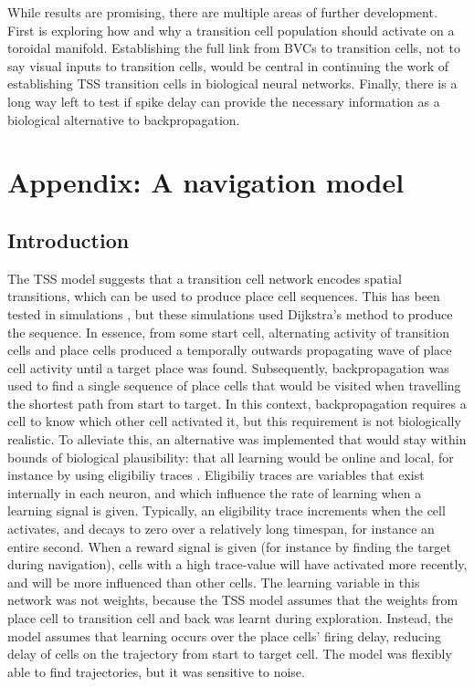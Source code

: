 \documentclass{article}
\begin{document}
    While results are promising, there are multiple areas of further development. First is exploring how and why a transition cell population should activate on a toroidal manifold. Establishing the full link from BVCs to transition cells, not to say visual inputs to transition cells, would be central in continuing the work of establishing TSS transition cells in biological neural networks. Finally, there is a long way left to test if spike delay can provide the necessary information as a biological alternative to backpropagation.

    \newpage
    \printbibliography{}

    \newpage
    \appendix
    \section{Appendix: A navigation model} \label{Appendix}
    \subsection{Introduction}
    The TSS model suggests that a transition cell network encodes spatial transitions, which can be used to produce place cell sequences. This has been tested in simulations \parencite{Waniek2020}, but these simulations used Dijkstra's method to produce the sequence. In essence, from some start cell, alternating activity of transition cells and place cells produced a temporally outwards propagating wave of place cell activity until a target place was found. Subsequently, backpropagation was used to find a single sequence of place cells that would be visited when travelling the shortest path from start to target. In this context, backpropagation requires a cell to know which other cell activated it, but this requirement is not biologically realistic.
    To alleviate this, an alternative was implemented that would stay within bounds of biological plausibility: that all learning would be online and local, for instance by using eligibiliy traces \parencite{VanDerVeen2022}. Eligibiliy traces are variables that exist internally in each neuron, and which influence the rate of learning when a learning signal is given. Typically, an eligibility trace increments when the cell activates, and decays to zero over a relatively long timespan, for instance an entire second. When a reward signal is given (for instance by finding the target during navigation), cells with a high trace-value will have activated more recently, and will be more influenced than other cells.
    The learning variable in this network was not weights, because the TSS model assumes that the weights from place cell to transition cell and back was learnt during exploration. Instead, the model assumes that learning occurs over the place cells' firing delay, reducing delay of cells on the trajectory from start to target cell. The model was flexibly able to find trajectories, but it was sensitive to noise.
\end{document}
